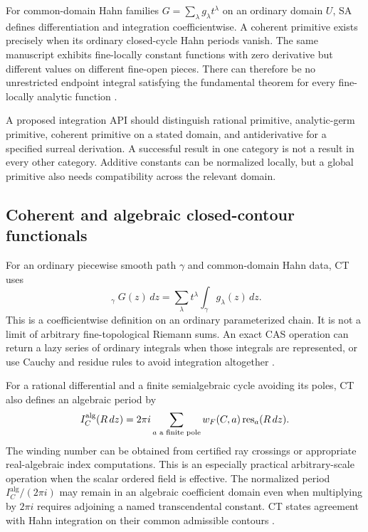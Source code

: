 \documentclass[11pt,letterpaper]{article}
\theoremstyle{definition}\newtheorem{definition}[theorem]{Definition}
\theoremstyle{remark}\newtheorem{remark}[theorem]{Remark}
\newcommand{\HInt}{\mathop{\int^{\!H}}\nolimits}
\numberwithin{equation}{section}\setcounter{tocdepth}{2}
\begin{document}
For common-domain Hahn families $G=\sum_\lambda g_\lambda t^\lambda$ on an ordinary domain $U$, SA defines differentiation and integration coefficientwise. A coherent primitive exists precisely when its ordinary closed-cycle Hahn periods vanish. The same manuscript exhibits fine-locally constant functions with zero derivative but different values on different fine-open pieces. There can therefore be no unrestricted endpoint integral satisfying the fundamental theorem for every fine-locally analytic function \cite{SA,CT}.

A proposed integration API should distinguish rational primitive, analytic-germ primitive, coherent primitive on a stated domain, and antiderivative for a specified surreal derivation. A successful result in one category is not a result in every other category. Additive constants can be normalized locally, but a global primitive also needs compatibility across the relevant domain.

\subsection{Coherent and algebraic closed-contour functionals}
For an ordinary piecewise smooth path $\gamma$ and common-domain Hahn data, CT uses
\begin{equation}\label{eq:Hintegral}
 \HInt_\gamma G(z)\,dz
 =\sum_\lambda t^\lambda\int_\gamma g_\lambda(z)\,dz.
\end{equation}
This is a coefficientwise definition on an ordinary parameterized chain. It is not a limit of arbitrary fine-topological Riemann sums. An exact CAS operation can return a lazy series of ordinary integrals when those integrals are represented, or use Cauchy and residue rules to avoid integration altogether \cite{CT}.

For a rational differential and a finite semialgebraic cycle avoiding its poles, CT also defines an algebraic period by
\begin{equation}\label{eq:algebraicperiod}
 I_C^{\mathrm{alg}}(R\,dz)
 =2\pi i\sum_{a\text{ a finite pole}} w_F(C,a)\operatorname{res}_a(R\,dz).
\end{equation}
The winding number can be obtained from certified ray crossings or appropriate real-algebraic index computations. This is an especially practical arbitrary-scale operation when the scalar ordered field is effective. The normalized period $I_C^{\mathrm{alg}}/(2\pi i)$ may remain in an algebraic coefficient domain even when multiplying by $2\pi i$ requires adjoining a named transcendental constant. CT states agreement with Hahn integration on their common admissible contours \cite{CT}.
\end{document}
